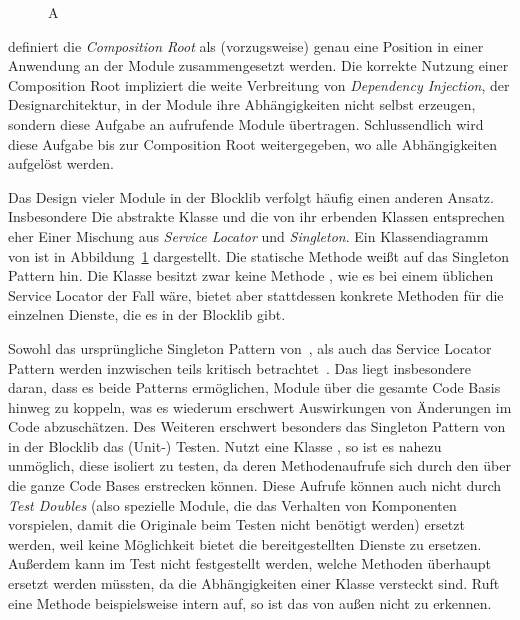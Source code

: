 \begin{figure}
  \begin{center}
    
  \end{center}
  \caption{A}\label{fig:diagContext}
\end{figure}
\textcite[S.~76]{Seemann2012} definiert die \emph{Composition Root} als (vorzugsweise) genau eine Position in einer Anwendung an der Module zusammengesetzt werden. Die korrekte Nutzung einer Composition Root impliziert die weite Verbreitung von \emph{Dependency Injection}, der Designarchitektur, in der Module ihre Abhängigkeiten nicht selbst erzeugen, sondern diese Aufgabe an aufrufende Module übertragen. Schlussendlich wird diese Aufgabe bis zur Composition Root weitergegeben, wo alle Abhängigkeiten aufgelöst werden. 


Das Design vieler Module in der Blocklib verfolgt häufig einen anderen Ansatz. Insbesondere Die abstrakte Klasse  und die von ihr erbenden Klassen entsprechen eher Einer Mischung aus \emph{Service Locator} und \emph{Singleton}. Ein Klassendiagramm von  ist in Abbildung~\ref{fig:diagContext} dargestellt. Die statische Methode  weißt auf das Singleton Pattern hin. Die Klasse besitzt zwar keine Methode , wie es bei einem üblichen Service Locator der Fall wäre, bietet aber stattdessen konkrete Methoden für die einzelnen Dienste, die es in der Blocklib gibt.

Sowohl das ursprüngliche Singleton Pattern von~\textcite[S.~127~ff.]{Gamma2016}, als auch das Service Locator Pattern werden inzwischen teils kritisch betrachtet~\cite[S.~103~ff.]{Nystrom2015}\cite[S.~154~ff.]{Seemann2012}. Das liegt insbesondere daran, dass es beide Patterns ermöglichen, Module über die gesamte Code Basis hinweg zu koppeln, was es wiederum erschwert Auswirkungen von Änderungen im Code abzuschätzen. Des Weiteren erschwert besonders das Singleton Pattern von  in der Blocklib das (Unit-) Testen. Nutzt eine Klasse , so ist es nahezu unmöglich, diese isoliert zu testen, da deren Methodenaufrufe sich durch den  über die ganze Code Bases erstrecken können. Diese  Aufrufe können auch nicht durch \emph{Test Doubles} (also spezielle Module, die das Verhalten von Komponenten vorspielen, damit die Originale beim Testen nicht benötigt werden) ersetzt werden, weil  keine Möglichkeit bietet die bereitgestellten Dienste zu ersetzen. Außerdem kann im Test nicht festgestellt werden, welche Methoden überhaupt ersetzt werden müssten, da die Abhängigkeiten einer Klasse versteckt sind. Ruft eine Methode beispielsweise intern  auf, so ist das von außen nicht zu erkennen.

